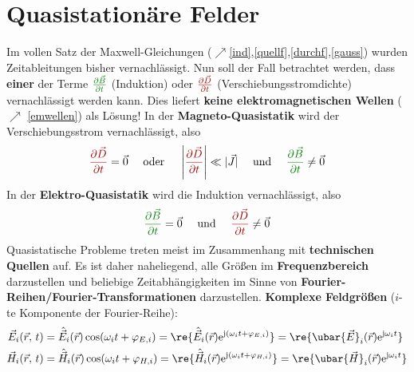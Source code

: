 \chapter{Quasistationäre Felder}\label{quasistat}
Im vollen Satz der Maxwell-Gleichungen ($\nearrow$\ref{ind},\ref{quellf},\ref{durchf},\ref{gauss}) wurden Zeitableitungen bisher vernachlässigt. Nun soll der Fall betrachtet werden, dass \textbf{einer} der Terme $\textcolor{green}{\frac{\partial \vec{B} }{\partial t}}$ (Induktion) oder $\textcolor{red}{\frac{\partial \vec{D} }{\partial t}}$ (Verschiebungsstromdichte) vernachlässigt werden kann. Dies liefert \textbf{keine elektromagnetischen Wellen} ($\nearrow$ \ref{emwellen}) als Lösung! In der \textbf{Magneto-Quasistatik} wird der Verschiebungsstrom vernachlässigt, also 
\begin{equation}\label{annmqs}
	\textcolor{red}{\frac{\partial \vec{D} }{\partial t}} = \vec{0}\quad\text{ oder }\quad\left|\textcolor{red}{\frac{\partial \vec{D} }{\partial t}}\right|\ll |\vec{J}| \quad\text{ und }\quad \textcolor{green}{\frac{\partial \vec{B} }{\partial t}}\neq\vec{0}
\end{equation}
In der \textbf{Elektro-Quasistatik} wird die Induktion vernachlässigt, also 
\begin{equation}\label{anneqs}
\textcolor{green}{\frac{\partial \vec{B} }{\partial t}}=\vec{0} \quad \text{ und } \quad \textcolor{red}{\frac{\partial \vec{D} }{\partial t}} \neq \vec{0}
\end{equation}
 Quasistatische Probleme treten meist im Zusammenhang mit \textbf{technischen Quellen} auf.  Es ist daher naheliegend, alle Größen im \textbf{Frequenzbereich} darzustellen und beliebige Zeitabhängigkeiten im Sinne von \textbf{Fourier-Reihen/Fourier-Transformationen} darzustellen. \textbf{Komplexe Feldgrößen} ($i$-te Komponente der Fourier-Reihe):
		        \begin{equation}\label{frequenzbereich}\begin{split}
				        \vec{E}_i(\vec{r} ,\,t) &= \hat{\vec{E}}_i(\vec{r} )  \cos(\omega_i  t + \varphi_{E,i}) = \re{\hat{\vec{E}}_i(\vec{r} )  \mathrm{e}^{\mathrm{j} (\omega_i  t +  \varphi_{E,i})} } = \re{\ubar{\vec{E}}_i(\vec{r} )  \mathrm{e}^{\mathrm{j} \omega_i  t } }\\
				        \vec{H}_i(\vec{r} ,\,t) &= \hat{\vec{H}}_i(\vec{r} )  \cos(\omega_i  t + \varphi_{H,i}) = \re{\hat{\vec{H}}_i(\vec{r} )  \mathrm{e}^{\mathrm{j} (\omega_i  t +  \varphi_{H,i})} } = \re{\ubar{\vec{H}}_i(\vec{r} )  \mathrm{e}^{\mathrm{j} \omega_i  t } }
			        \end{split}\end{equation}
